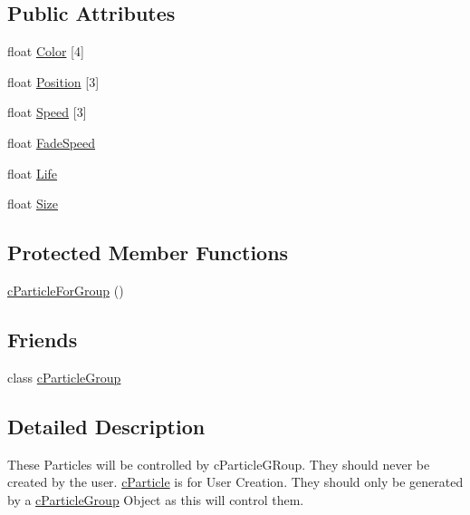 \subsection*{Public Attributes}
\begin{DoxyCompactItemize}
\item 
float \hyperlink{classc_particle_for_group_af337f9a80785f8bbad797283a5f308d9}{Color} \mbox{[}4\mbox{]}
\item 
float \hyperlink{classc_particle_for_group_af16135676cbf82e97ad5aab1cc0cc9cc}{Position} \mbox{[}3\mbox{]}
\item 
float \hyperlink{classc_particle_for_group_a770a82116f2cfa3662573f1a13e3c3e1}{Speed} \mbox{[}3\mbox{]}
\item 
float \hyperlink{classc_particle_for_group_a9991442c8b687c6f689fd6002bf7ee62}{FadeSpeed}
\item 
float \hyperlink{classc_particle_for_group_ab0febcee2beb0b15748540220a433546}{Life}
\item 
float \hyperlink{classc_particle_for_group_a6eb5c1f7faf24e99e75da53f37222105}{Size}
\end{DoxyCompactItemize}
\subsection*{Protected Member Functions}
\begin{DoxyCompactItemize}
\item 
\hyperlink{classc_particle_for_group_a13be26be79ebc9bf90c6fc2223e94514}{cParticleForGroup} ()
\end{DoxyCompactItemize}
\subsection*{Friends}
\begin{DoxyCompactItemize}
\item 
class \hyperlink{classc_particle_for_group_a1b9804a50989e002dc64e1ac309a445d}{cParticleGroup}
\end{DoxyCompactItemize}


\subsection{Detailed Description}
These Particles will be controlled by cParticleGRoup. They should never be created by the user. \hyperlink{classc_particle}{cParticle} is for User Creation. They should only be generated by a \hyperlink{classc_particle_group}{cParticleGroup} Object as this will control them. 

